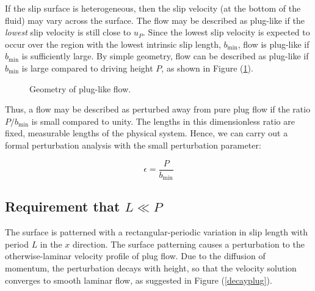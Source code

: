 \documentclass[12pt, a4paper, twoside, openright]{book}
\newcommand{\bmin}{\ensuremath{b_{\mathrm{min}}}}
\begin{document}
If the slip surface is heterogeneous, then the slip velocity (at the bottom of the fluid) may vary across the surface.  The flow may be described as plug-like if the \emph{lowest} slip velocity is still close to $u_P$.  Since the lowest slip velocity is expected to occur over the region with the lowest intrinsic slip length, $\bmin$, flow is plug-like if $\bmin$ is sufficiently large.  By simple geometry, flow can be described as plug-like if $\bmin$ is large compared to driving height $P$, as shown in Figure (\ref{geometry}).

\clearpage

\begin{figure}[ht]
\centering
{}
\caption{Geometry of plug-like flow.} \label{geometry}
\end{figure}

Thus, a flow may be described as perturbed away from pure plug flow if the ratio $P/ \bmin$ is small compared to unity.  The lengths in this dimensionless ratio are fixed, measurable lengths of the physical system.  Hence, we can carry out a formal perturbation analysis with the small perturbation parameter:

\begin{equation}
\epsilon = \frac{P}{\bmin}
\end{equation}


\clearpage
\subsection{Requirement that $ L \ll P$}

The surface is patterned with a rectangular-periodic variation in slip length with period $L$ in the $x$ direction. The surface patterning causes a perturbation to the otherwise-laminar velocity profile of plug flow.  Due to the diffusion of momentum, the perturbation decays with height, so that the velocity solution converges to smooth laminar flow, as suggested in Figure (\ref{decayplug}).
\end{document}
